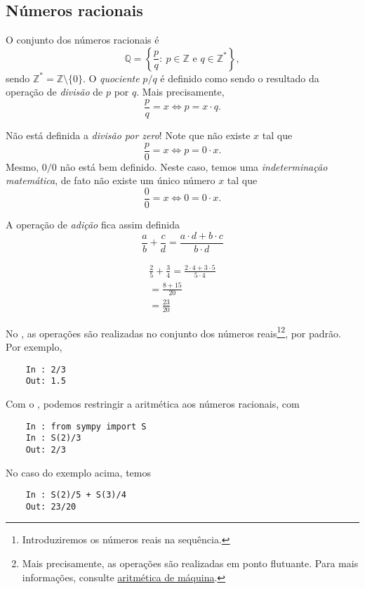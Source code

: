 \subsection{Números racionais}

O conjunto dos números racionais é
\begin{equation}
  \mathbb{Q} = \left\{\frac{p}{q}:~p\in\mathbb{Z}\text{ e }q\in\mathbb{Z}^*\right\},
\end{equation}
sendo $\mathbb{Z}^*=\mathbb{Z}\setminus\{0\}$. O \emph{quociente} $p/q$ é definido como sendo o resultado da operação de \emph{divisão} de $p$ por $q$. Mais precisamente,
\begin{equation}
  \frac{p}{q} = x \Leftrightarrow p = x\cdot q.
\end{equation}

\begin{obs}
  Não está definida a \emph{divisão por zero}! Note que não existe $x$ tal que
  \begin{equation}
    \frac{p}{0} = x \Leftrightarrow p = 0\cdot x.
  \end{equation}
  Mesmo, $0/0$ não está bem definido. Neste caso, temos uma \emph{indeterminação matemática}, de fato não existe um único número $x$ tal que
  \begin{equation}
    \frac{0}{0} = x \Leftrightarrow 0 = 0\cdot x.
  \end{equation}
\end{obs}

A operação de \emph{adição} fica assim definida
\begin{equation}
  \frac{a}{b} + \frac{c}{d} = \frac{a\cdot d + b\cdot c}{b\cdot d}
\end{equation}

\begin{ex}
  \begin{gather}
    \frac{2}{5} + \frac{3}{4} = \frac{2\cdot 4 + 3\cdot 5}{5\cdot 4} \\
    = \frac{8 + 15}{20} \\
    = \frac{23}{20}
  \end{gather}

  \ifispython
  No \python, as operações são realizadas no conjunto dos números reais\footnote{Introduziremos os números reais na sequência.}\footnote{Mais precisamente, as operações são realizadas em ponto flutuante. Para mais informações, consulte \href{https://phkonzen.github.io/notas/MatematicaNumerica/cap_aritm.html}{aritmética de máquina}.}, por padrão. Por exemplo,
  \begin{lstlisting}
    In : 2/3
    Out: 1.5
  \end{lstlisting}
  Com o \sympy, podemos restringir a aritmética aos números racionais, com
  \begin{lstlisting}
    In : from sympy import S
    In : S(2)/3
    Out: 2/3
  \end{lstlisting}
  No caso do exemplo acima, temos
  \begin{lstlisting}
    In : S(2)/5 + S(3)/4
    Out: 23/20
  \end{lstlisting}
  \fi
\end{ex}

